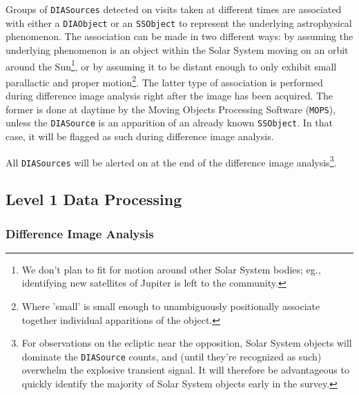 \documentclass[12pt]{article}
\newcommand{\code}[1]{\texttt{#1}}
\newcommand{\DIASource}{\code{DIASource}\xspace}
\newcommand{\DIASources}{\code{DIASources}\xspace}
\newcommand{\DIAObject}{\code{DIAObject}\xspace}
\newcommand{\SSObject}{\code{SSObject}\xspace}
\begin{document}
Groups of \DIASources detected on visits taken at different times are associated with either a \DIAObject or an \SSObject to represent the underlying astrophysical phenomenon. The association can be made in two different ways: by assuming the underlying phenomenon is an object within the Solar System moving on an orbit around the Sun\footnote{We don't plan to fit for motion around other Solar System bodies; eg., identifying new satellites of Jupiter is left to the community.}, or by assuming it to be distant enough to only exhibit small parallactic and proper motion\footnote{Where 'small' is small enough to unambiguously positionally associate together individual apparitions of the object.}. The latter type of association is performed during difference image analysis right after the image has been acquired. The former is done at daytime by the Moving Objects Processing Software (\code{MOPS}), unless the \DIASource is an apparition of an already known \SSObject. In that case, it will be flagged as such during difference image analysis.

All \DIASources will be alerted on at the end of the difference image analysis\footnote{For observations on the ecliptic near the opposition, Solar System objects will dominate the \DIASource counts, and (until they're recognized as such) overwhelm the explosive transient signal. It will therefore be advantageous to quickly identify the majority of Solar System objects early in the survey.}.

\subsection{Level 1 Data Processing}

\subsubsection{Difference Image Analysis}
\label{sec:dia}
\end{document}
